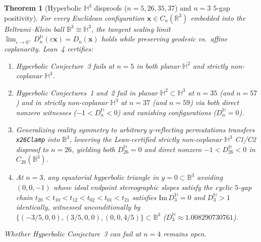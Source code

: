 \documentclass[11pt,reqno]{amsart}
\newtheorem{theorem}{Theorem}[section]
\theoremstyle{remark}
\newcommand{\R}{\mathbb{R}}
\newcommand{\B}{\mathbb{B}}
\newcommand{\Hy}{\mathbb{H}}
\begin{document}
\begin{theorem}[Hyperbolic $\Hy^3$ disproofs ($n = 5, 26, 35, 37$) and $n = 3$ $5$-gap positivity]\label{thm:main-hyp}
For every Euclidean configuration $\mathbf{x} \in C_n(\R^3)$ embedded into the Beltrami--Klein ball $\B^3 \cong \Hy^3$, the tangent scaling limit $\lim_{\varepsilon \to 0^+} D_n^{\Hy}(\varepsilon \mathbf{x}) = D_n(\mathbf{x})$ holds while preserving geodesic vs.\ affine coplanarity.
Lean~4 certifies:
\begin{enumerate}
  \item Hyperbolic Conjecture~3 fails at $n = 5$ in both planar $\Hy^2$ and strictly non-coplanar $\Hy^3$.
  \item Hyperbolic Conjectures~1 and~2 fail in planar $\Hy^2 \subset \Hy^3$ at $n = 35$ (and $n = 57$) and in strictly non-coplanar $\Hy^3$ at $n = 37$ (and $n = 59$) via both direct nonzero witnesses ($-1 < D_n^{\Hy} < 0$) and vanishing configurations ($D_n^{\Hy} = 0$).
  \item Generalizing reality symmetry to arbitrary $y$-reflecting permutations transfers \texttt{x26Clamp} into $\B^3$, lowering the Lean-certified strictly non-coplanar $\Hy^3$ C1/C2 disproof to $n = 26$, yielding both $D_{26}^{\Hy} = 0$ and direct nonzero $-1 < D_{26}^{\Hy} < 0$ in $C_{26}(\B^3)$.
  \item At $n = 3$, any equatorial hyperbolic triangle in $y = 0 \subset \B^3$ avoiding $(0,0,-1)$ whose ideal endpoint stereographic slopes satisfy the cyclic $5$-gap chain $t_{20} < t_{10} < t_{12} < t_{02} < t_{01} < t_{21}$ satisfies $\mathrm{Im}\, D_3^{\Hy} = 0$ and $D_3^{\Hy} > 1$ identically, witnessed unconditionally by $\{(-3/5,0,0), (3/5,0,0), (0,0,4/5)\} \subset \B^3$ ($D_3^{\Hy} \approx 1.008290730761$).
\end{enumerate}
Whether Hyperbolic Conjecture~3 can fail at $n = 4$ remains open.
\end{theorem}
\end{document}
